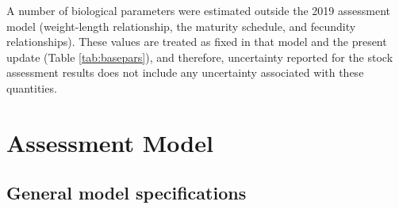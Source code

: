 \documentclass[11pt,
  english,
  a4paper,
]{article}
\begin{document}
\leavevmode\tagmcend\tagstructend


A number of biological parameters were estimated outside the 2019 assessment model (weight-length relationship, the maturity schedule, and fecundity relationships). These values are treated as fixed in that model and the present update (Table \ref{tab:basepars}), and therefore, uncertainty reported for the stock assessment results does not include any uncertainty associated with these quantities.

\leavevmode\tagmcend\tagstructend\par


\hypertarget{assessment-model}{%
\section{Assessment Model}\label{assessment-model}}

\leavevmode\tagmcend\tagstructend


\hypertarget{general-model-specifications}{%
\subsection{General model specifications}\label{general-model-specifications}}

\leavevmode\tagmcend\tagstructend

\end{document}
